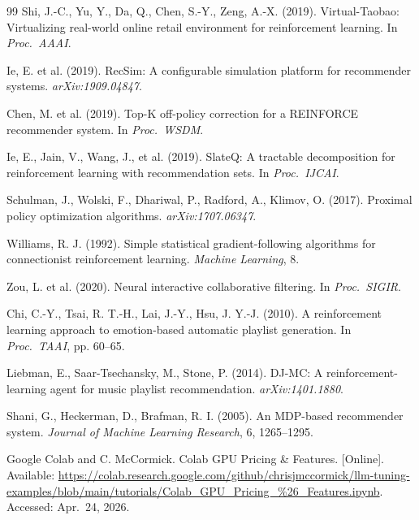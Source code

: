 \documentclass[11pt]{article}
\begin{document}
\begin{thebibliography}{99}
Shi, J.-C., Yu, Y., Da, Q., Chen, S.-Y., Zeng, A.-X. (2019).
\newblock Virtual-Taobao: Virtualizing real-world online retail
environment for reinforcement learning. In \emph{Proc.\ AAAI}.

Ie, E. et al. (2019).
\newblock RecSim: A configurable simulation platform for recommender
systems. \emph{arXiv:1909.04847}.

Chen, M. et al. (2019).
\newblock Top-K off-policy correction for a REINFORCE recommender
system. In \emph{Proc.\ WSDM}.

Ie, E., Jain, V., Wang, J., et al. (2019).
\newblock SlateQ: A tractable decomposition for reinforcement learning
with recommendation sets. In \emph{Proc.\ IJCAI}.

Schulman, J., Wolski, F., Dhariwal, P., Radford, A., Klimov, O. (2017).
\newblock Proximal policy optimization algorithms.
\emph{arXiv:1707.06347}.

Williams, R. J. (1992).
\newblock Simple statistical gradient-following algorithms for
connectionist reinforcement learning. \emph{Machine Learning}, 8.

Zou, L. et al. (2020).
\newblock Neural interactive collaborative filtering. In \emph{Proc.\ SIGIR}.

Chi, C.-Y., Tsai, R. T.-H., Lai, J.-Y., Hsu, J. Y.-J. (2010).
\newblock A reinforcement learning approach to emotion-based automatic
playlist generation. In \emph{Proc.\ TAAI}, pp. 60--65.

Liebman, E., Saar-Tsechansky, M., Stone, P. (2014).
\newblock DJ-MC: A reinforcement-learning agent for music playlist
recommendation. \emph{arXiv:1401.1880}.

Shani, G., Heckerman, D., Brafman, R. I. (2005).
\newblock An MDP-based recommender system. \emph{Journal of Machine
Learning Research}, 6, 1265--1295.

Google Colab and C. McCormick.
\newblock Colab GPU Pricing \& Features. [Online].
Available: \url{https://colab.research.google.com/github/chrisjmccormick/llm-tuning-examples/blob/main/tutorials/Colab_GPU_Pricing_%26_Features.ipynb}.
Accessed: Apr.\ 24, 2026.

\end{thebibliography}
\end{document}
